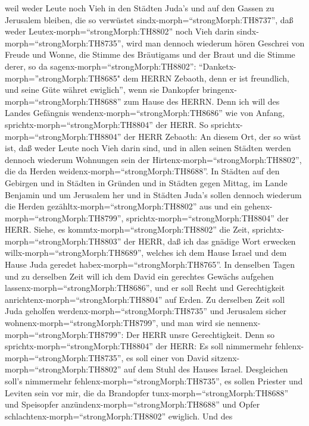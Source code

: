 weil weder Leute noch Vieh in den Städten Juda's und auf den Gassen zu
Jerusalem bleiben, die so verwüstet sindx-morph=``strongMorph:TH8737'',
daß weder Leutex-morph=``strongMorph:TH8802'' noch Vieh darin
sindx-morph=``strongMorph:TH8735'',  wird man dennoch
wiederum hören Geschrei von Freude und Wonne, die Stimme des Bräutigams
und der Braut und die Stimme derer, so da
sagenx-morph=``strongMorph:TH8802'':
``Danketx-morph=''strongMorph:TH8685" dem HERRN Zebaoth, denn er ist
freundlich, und seine Güte währet ewiglich'', wenn sie Dankopfer
bringenx-morph=``strongMorph:TH8688'' zum Hause des HERRN. Denn ich will
des Landes Gefängnis wendenx-morph=``strongMorph:TH8686'' wie von
Anfang, sprichtx-morph=``strongMorph:TH8804'' der HERR.  So
sprichtx-morph=``strongMorph:TH8804'' der HERR Zebaoth: An diesem Ort,
der so wüst ist, daß weder Leute noch Vieh darin sind, und in allen
seinen Städten werden dennoch wiederum Wohnungen sein der
Hirtenx-morph=``strongMorph:TH8802'', die da Herden
weidenx-morph=``strongMorph:TH8688''.  In Städten auf den
Gebirgen und in Städten in Gründen und in Städten gegen Mittag, im Lande
Benjamin und um Jerusalem her und in Städten Juda's sollen dennoch
wiederum die Herden gezähltx-morph=``strongMorph:TH8802'' aus und ein
gehenx-morph=``strongMorph:TH8799'',
sprichtx-morph=``strongMorph:TH8804'' der HERR.  Siehe, es
kommtx-morph=``strongMorph:TH8802'' die Zeit,
sprichtx-morph=``strongMorph:TH8803'' der HERR, daß ich das gnädige Wort
erwecken willx-morph=``strongMorph:TH8689'', welches ich dem Hause
Israel und dem Hause Juda geredet habex-morph=``strongMorph:TH8765''.
 In denselben Tagen und zu derselben Zeit will ich dem
David ein gerechtes Gewächs aufgehen
lassenx-morph=``strongMorph:TH8686'', und er soll Recht und
Gerechtigkeit anrichtenx-morph=``strongMorph:TH8804'' auf Erden.
 Zu derselben Zeit soll Juda geholfen
werdenx-morph=``strongMorph:TH8735'' und Jerusalem sicher
wohnenx-morph=``strongMorph:TH8799'', und man wird sie
nennenx-morph=``strongMorph:TH8799'': Der HERR unsre Gerechtigkeit.
 Denn so sprichtx-morph=``strongMorph:TH8804'' der HERR: Es
soll nimmermehr fehlenx-morph=``strongMorph:TH8735'', es soll einer von
David sitzenx-morph=``strongMorph:TH8802'' auf dem Stuhl des Hauses
Israel.  Desgleichen soll's nimmermehr
fehlenx-morph=``strongMorph:TH8735'', es sollen Priester und Leviten
sein vor mir, die da Brandopfer tunx-morph=``strongMorph:TH8688'' und
Speisopfer anzündenx-morph=``strongMorph:TH8688'' und Opfer
schlachtenx-morph=``strongMorph:TH8802'' ewiglich.  Und des
